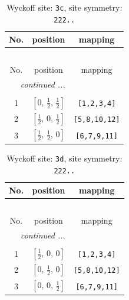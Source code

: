 \documentclass[fleqn,8pt]{jsarticle}
\begin{document}
\begin{longtable}{ccc}
\caption{Wyckoff site: {\tt 3c}, site symmetry: {\tt 222..}}
 \\
 \hline \hline
No. & position & mapping \\ \hline \endfirsthead

\multicolumn{2}{l}{\tablename\ \thetable{}} \\
 \hline \hline
No. & position & mapping \\ \hline \endhead

 \hline \hline
\multicolumn{2}{r}{\footnotesize\it continued ...} \\ \endfoot

 \hline \hline
\multicolumn{2}{r}{} \\ \endlastfoot

1 & $\left[ 0,\, \frac{1}{2},\, \frac{1}{2} \right]$ & {\tt [1,2,3,4]} \\ \hline
2 & $\left[ \frac{1}{2},\, 0,\, \frac{1}{2} \right]$ & {\tt [5,8,10,12]} \\ \hline
3 & $\left[ \frac{1}{2},\, \frac{1}{2},\, 0 \right]$ & {\tt [6,7,9,11]} \\
\end{longtable}
\renewcommand{\arraystretch}{1.2}
\begin{longtable}{ccc}
\caption{Wyckoff site: {\tt 3d}, site symmetry: {\tt 222..}}
 \\
 \hline \hline
No. & position & mapping \\ \hline \endfirsthead

\multicolumn{2}{l}{\tablename\ \thetable{}} \\
 \hline \hline
No. & position & mapping \\ \hline \endhead

 \hline \hline
\multicolumn{2}{r}{\footnotesize\it continued ...} \\ \endfoot

 \hline \hline
\multicolumn{2}{r}{} \\ \endlastfoot

1 & $\left[ \frac{1}{2},\, 0,\, 0 \right]$ & {\tt [1,2,3,4]} \\ \hline
2 & $\left[ 0,\, \frac{1}{2},\, 0 \right]$ & {\tt [5,8,10,12]} \\ \hline
3 & $\left[ 0,\, 0,\, \frac{1}{2} \right]$ & {\tt [6,7,9,11]} \\
\end{longtable}
\renewcommand{\arraystretch}{1.2}
\end{document}
